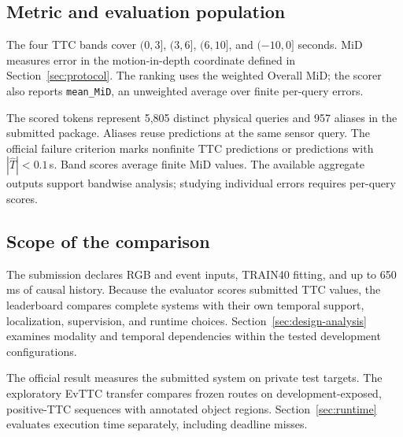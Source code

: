 \subsection{Metric and evaluation population}

The four TTC bands cover $(0,3]$, $(3,6]$, $(6,10]$, and $(-10,0]$ seconds. MiD measures error in the motion-in-depth coordinate defined in Section~\ref{sec:protocol}. The ranking uses the weighted Overall MiD; the scorer also reports \texttt{mean\_MiD}, an unweighted average over finite per-query errors. \citep{garlscorer2026}

The \OfficialSampleCount{} scored tokens represent 5,805 distinct physical queries and 957 aliases in the submitted package. Aliases reuse predictions at the same sensor query. The official failure criterion marks nonfinite TTC predictions or predictions with $|\widehat T|<0.1$\,s. Band scores average finite MiD values. The available aggregate outputs support bandwise analysis; studying individual errors requires per-query scores. 

\subsection{Scope of the comparison}

The submission declares RGB and event inputs, TRAIN40 fitting, and up to 650\,ms of causal history. Because the evaluator scores submitted TTC values, the leaderboard compares complete systems with their own temporal support, localization, supervision, and runtime choices. Section~\ref{sec:design-analysis} examines modality and temporal dependencies within the tested development configurations.

The official result measures the submitted system on private test targets. The exploratory EvTTC transfer compares frozen routes on development-exposed, positive-TTC sequences with annotated object regions. Section~\ref{sec:runtime} evaluates execution time separately, including deadline misses.
\FloatBarrier
